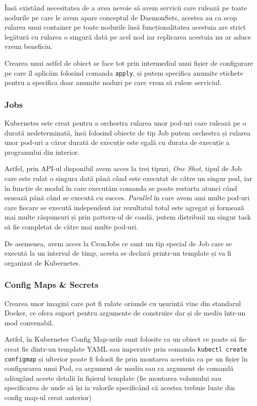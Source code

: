 Însă existând necesitatea de a avea nevoie să avem servicii care rulează pe toate
nodurile pe care le avem apare conceptul de DaemonSets, acestea au ca scop rularea unui container
pe toate nodurile însă funcționalitatea acestuia are strict legătură cu rularea o singură dată pe acel nod
iar replicarea acestuia nu ar aduce vreun beneficiu.

Crearea unui astfel de obiect se face tot prin intermediul unui fișier de configurare 
pe care îl aplicăm folosind comanda \verb|apply|, și putem specifica anumite etichete 
pentru a specifica doar anumite noduri pe care vrem să ruleze serviciul.

\subsubsection{Jobs}

Kubernetes este creat pentru a orchestra rularea unor pod-uri care rulează 
pe o durată nedeterminată, însă folosind obiecte de tip Job putem orchestra și 
rularea unor pod-uri a căror durată de execuție este egală cu durata de execuție
a programului din interior.

Astfel, prin API-ul disponibil avem acces la trei tipuri, \emph{One Shot}, tipul de Job 
care este rulat o singura dată până când este executat de către un singur pod, 
iar în funcție de modul în care executăm comanda se poate restarta atunci când eșuează 
până când se execută cu succes. \emph{Parallel} în care avem ami multe pod-uri care
fiecare se execută independent iar rezultatul total este agregat și formează mai multe răspunsuri 
și prin pattern-ul de coadă, putem distribuii un singur task să fie completat
de către mai multe pod-uri.

De asemenea, avem acces la CronJobs ce sunt un tip special de Job care se execută
la un interval de timp, acesta se declară printr-un template și va fi organizat
de Kubernetes.

\subsubsection{Config Maps & Secrets}

Crearea unor imagini care pot fi rulate oriunde cu ușurință vine din standarul Docker,
ce ofera suport pentru argumente de construire dar și de mediu într-un mod convenabil.

Astfel, în Kubernetes Config Map-urile sunt folosite ca un obiect ce poate să fie creat
fie dintr-un template YAML sau imperativ prin comanda \verb|kubectl create configmap|
și ulterior poate fi folosit fie prin montarea acestuia ca pe un fișier în configurarea
unui Pod, ca argument de mediu sau ca argument de comandă adăugând aceste detalii
în fișierul template (fie montarea volumului sau specificarea de unde să își ia valorile
specificând că acestea trebuie luate din config map-ul creat anterior)

